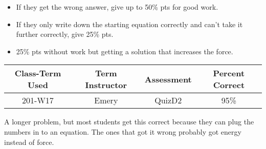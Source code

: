 \begin{rubric}

\begin{itemize}
	\item If they get the wrong answer, give up to 50\% pts for good work.
	\item If they only write down the starting equation correctly and can't take it further correctly, give 25\% pts.
	\item 25\% pts without work but getting a solution that increases the force.
\end{itemize}

\end{rubric}

\begin{outcomes}
	\begin{center}
		\begin{tabular}{cccc}
			\hline\hline
			Class-Term Used & Term Instructor & Assessment & Percent Correct\\
			\hline
			201-W17 & Emery & QuizD2 & 95\%\\    %
			\hline
		\end{tabular}
	\end{center}
\end{outcomes}

\begin{comments}

A longer problem, but most students get this correct because they can plug the numbers in to an equation. The ones that got it wrong probably got energy instead of force.
	
\end{comments}
